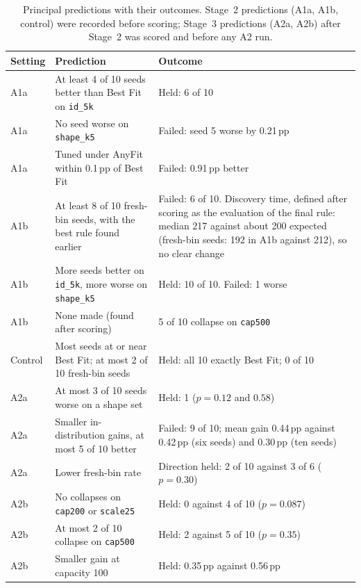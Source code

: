 \documentclass[10pt,twocolumn]{article}
\begin{document}
\begin{table}[t]
\centering\footnotesize
\caption{Principal predictions with their outcomes. Stage~2 predictions (A1a, A1b, control) were recorded before scoring; Stage~3 predictions (A2a, A2b) after Stage~2 was scored and before any A2 run.}
\label{tab:pred1}
\begin{tabularx}{\linewidth}{@{}lXX@{}}
\toprule
Setting & Prediction & Outcome\\
\midrule
A1a & At least 4 of 10 seeds better than Best Fit on \texttt{id\_5k} & Held: 6 of 10\\
A1a & No seed worse on \texttt{shape\_k5} & Failed: seed 5 worse by 0.21\,pp\\
A1a & Tuned under AnyFit within 0.1\,pp of Best Fit & Failed: 0.91\,pp better\\
A1b & At least 8 of 10 fresh-bin seeds, with the best rule found earlier & Failed: 6 of 10. Discovery time, defined after scoring as the evaluation of the final rule: median 217 against about 200 expected (fresh-bin seeds: 192 in A1b against 212), so no clear change\\
A1b & More seeds better on \texttt{id\_5k}, more worse on \texttt{shape\_k5} & Held: 10 of 10. Failed: 1 worse\\
A1b & None made (found after scoring) & 5 of 10 collapse on \texttt{cap500}\\
Control & Most seeds at or near Best Fit; at most 2 of 10 fresh-bin seeds & Held: all 10 exactly Best Fit; 0 of 10\\
\midrule
A2a & At most 3 of 10 seeds worse on a shape set & Held: 1 ($p=0.12$ and $0.58$)\\
A2a & Smaller in-distribution gains, at most 5 of 10 better & Failed: 9 of 10; mean gain 0.44\,pp against 0.42\,pp (six seeds) and 0.30\,pp (ten seeds)\\
A2a & Lower fresh-bin rate & Direction held: 2 of 10 against 3 of 6 ($p=0.30$)\\
A2b & No collapses on \texttt{cap200} or \texttt{scale25} & Held: 0 against 4 of 10 ($p=0.087$)\\
A2b & At most 2 of 10 collapse on \texttt{cap500} & Held: 2 against 5 of 10 ($p=0.35$)\\
A2b & Smaller gain at capacity 100 & Held: 0.35\,pp against 0.56\,pp\\
\bottomrule
\end{tabularx}
\end{table}
\end{document}
